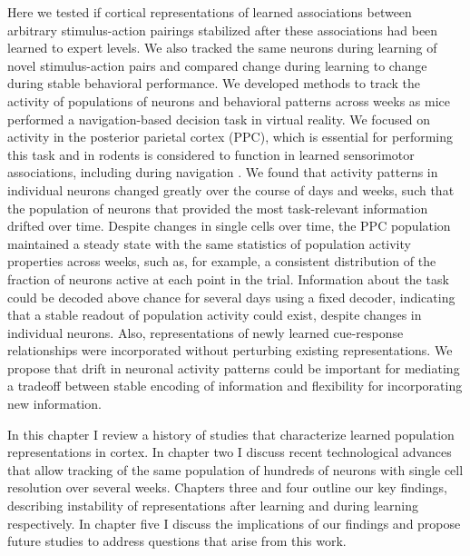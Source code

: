 Here we tested if cortical representations of learned associations between arbitrary stimulus-action pairings stabilized after these associations had been learned to expert levels. We also tracked the same neurons during learning of novel stimulus-action pairs and compared change during learning to change during stable behavioral performance. We developed methods to track the activity of populations of neurons and behavioral patterns across weeks as mice performed a navigation-based decision task in virtual reality. We focused on activity in the posterior parietal cortex (PPC), which is essential for performing this task and in rodents is considered to function in learned sensorimotor associations, including during navigation \citep{Harvey:2012du, McNaughton1994, Nitz2006, Whitlock2012}. We found that activity patterns in individual neurons changed greatly over the course of days and weeks, such that the population of neurons that provided the most task-relevant information drifted over time. Despite changes in single cells over time, the PPC population maintained a steady state with the same statistics of population activity properties across weeks, such as, for example, a consistent distribution of the fraction of neurons active at each point in the trial. Information about the task could be decoded above chance for several days using a fixed decoder, indicating that a stable readout of population activity could exist, despite changes in individual neurons. Also, representations of newly learned cue-response relationships were incorporated without perturbing existing representations. We propose that drift in neuronal activity patterns could be important for mediating a tradeoff between stable encoding of information and flexibility for incorporating new information.

\bigskip

In this chapter I review a history of studies that characterize learned population representations in cortex. In chapter two I discuss recent technological advances that allow tracking of the same population of hundreds of neurons with single cell resolution over several weeks. Chapters three and four outline our key findings, describing instability of representations after learning and during learning respectively. In chapter five I discuss the implications of our findings and propose future studies to address questions that arise from this work.

